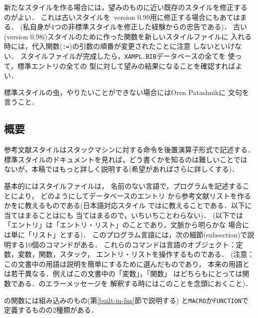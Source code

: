 新たなスタイルを作る場合には，望みのものに近い既存のスタイルを修正する
のがよい．
これは古いスタイルを\BibTeX\ version 0.99用に修正する場合にもあてはまる．
(私自身が4つの非標準スタイルを修正した経験からの忠告である)．
古い(version 0.98i)スタイルのために作った関数を新しいスタイルファイルに
入れる時には，代入関数({\tt :=})の引数の順番が変更されたことに注意
しないといけない．
スタイルファイルが完成したら，{\tt XAMPL.BIB}データベースの全てを
使って，標準エントリの全ての
型に対して望みの結果になることを確認すればよい．

標準スタイルの虫，やりたいことができない場合にはOren Patashnikに
文句を言うこと．

\subsection{概要}

参考文献スタイルはスタックマシンに対する命令を後置演算子形式で記述する．
標準スタイルのドキュメントを見れば，どう書くかを知るのは難しいことでは
ないが，本稿ではもっと詳しく説明する(希望があればさらに詳しくする)．

基本的にはスタイルファイルは，
名前のない言語で，プログラムを記述することにより，
どのようにしてデータベースのエントリ
から参考文献リストを作るかを\BibTeX に教えるものである(日本語対応スタイル
では\JBibTeX に教えることである．以下\BibTeX に当てはまることは\JBibTeX にも
当てはまるので，いちいちことわらない)．
(以下では「エントリ」は「エントリ・リスト」のことであり，文脈から明らかな
場合には単に「リスト」とする)．
このプログラム言語には，次の細節(subsection)で説明する10個のコマンドがある．
これらのコマンドは言語のオブジェクト：定数，変数，関数，スタック，
エントリ・リストを操作するものである．
(注意：この文書中の用語は説明を簡単にするために選んだものであり，
\BibTeX 本来の用語とは若干異なる．例えばこの文書中の「変数」，「関数」
はどちらも\BibTeX にとっては関数である．\BibTeX のエラーメッセージを
解釈する時にはこのことを念頭におくこと)．

\BibTeX の関数には{\dg 組み込み}のもの(第\ref{built-in-fns}節で説明する)
と{\tt MACRO}か{\tt FUNCTION}で定義するものの2種類がある．

